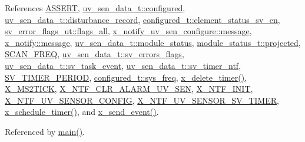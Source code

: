 References \hyperlink{a00072_source_l00059}{A\+S\+S\+E\+R\+T}, \hyperlink{a00035_source_l00044}{uv\+\_\+sen\+\_\+data\+\_\+t\+::configured}, \hyperlink{a00035_source_l00049}{uv\+\_\+sen\+\_\+data\+\_\+t\+::disturbance\+\_\+record}, \hyperlink{a00021_source_l00205}{configured\+\_\+t\+::element\+\_\+status\+\_\+sv\+\_\+en}, \hyperlink{a00022_source_l00044}{sv\+\_\+error\+\_\+flags\+\_\+ut\+::flags\+\_\+all}, \hyperlink{a00020_a1497b20cf78cad9e85b8ed48a9aa7bd2}{x\+\_\+notify\+\_\+uv\+\_\+sen\+\_\+configure\+::message}, \hyperlink{a00036_source_l00075}{x\+\_\+notify\+::message}, \hyperlink{a00035_source_l00053}{uv\+\_\+sen\+\_\+data\+\_\+t\+::module\+\_\+status}, \hyperlink{a00017_a6b2516d74583418cec324c50041421c9}{module\+\_\+status\+\_\+t\+::projected}, \hyperlink{a00021_source_l00096}{S\+C\+A\+N\+\_\+\+F\+R\+E\+Q}, \hyperlink{a00035_source_l00059}{uv\+\_\+sen\+\_\+data\+\_\+t\+::sv\+\_\+errors\+\_\+flags}, \hyperlink{a00035_source_l00037}{uv\+\_\+sen\+\_\+data\+\_\+t\+::sv\+\_\+task\+\_\+event}, \hyperlink{a00035_source_l00040}{uv\+\_\+sen\+\_\+data\+\_\+t\+::sv\+\_\+timer\+\_\+ntf}, \hyperlink{a00023_source_l00020}{S\+V\+\_\+\+T\+I\+M\+E\+R\+\_\+\+P\+E\+R\+I\+O\+D}, \hyperlink{a00021_source_l00192}{configured\+\_\+t\+::sys\+\_\+freq}, \hyperlink{a00037_source_l00482}{x\+\_\+delete\+\_\+timer()}, \hyperlink{a00036_source_l00048}{X\+\_\+\+M\+S2\+T\+I\+C\+K}, \hyperlink{a00021_source_l00174}{X\+\_\+\+N\+T\+F\+\_\+\+C\+L\+R\+\_\+\+A\+L\+A\+R\+M\+\_\+\+U\+V\+\_\+\+S\+E\+N}, \hyperlink{a00036_source_l00030}{X\+\_\+\+N\+T\+F\+\_\+\+I\+N\+I\+T}, \hyperlink{a00020_source_l00012}{X\+\_\+\+N\+T\+F\+\_\+\+U\+V\+\_\+\+S\+E\+N\+S\+O\+R\+\_\+\+C\+O\+N\+F\+I\+G}, \hyperlink{a00035_source_l00016}{X\+\_\+\+N\+T\+F\+\_\+\+U\+V\+\_\+\+S\+E\+N\+S\+O\+R\+\_\+\+S\+V\+\_\+\+T\+I\+M\+E\+R}, \hyperlink{a00037_source_l00456}{x\+\_\+schedule\+\_\+timer()}, and \hyperlink{a00037_source_l00381}{x\+\_\+send\+\_\+event()}.



Referenced by \hyperlink{a00048_source_l00080}{main()}.


